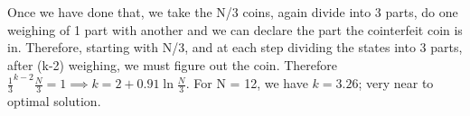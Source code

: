 \documentclass[10pt,answers]{exam}
\begin{document}
\begin{questions}
\begin{parts}
\begin{solution}
        Once we have done that, we take the N/3 coins, again divide into 3
        parts, do one weighing of 1 part with another and we can declare the
        part the cointerfeit coin is in. Therefore, starting with N/3, and at
        each step dividing the states into 3 parts, after (k-2) weighing, we
        must figure out the coin. Therefore
        \(\frac{1}{3}^{k-2} \frac{N}{3} = 1 \implies k = 2 + 0.91 \ln \frac{N}{3}\).
        For N = 12, we have \(k = 3.26\); very near to optimal solution.

    \end{solution}

\end{parts}



\end{questions}
\end{document}
